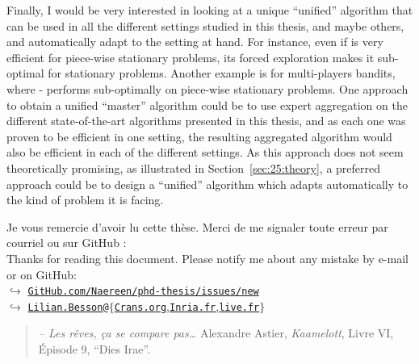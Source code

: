 Finally, I would be very interested in looking at a unique ``unified'' algorithm that can be used in all the different settings studied in this thesis, and maybe others, and automatically adapt to the setting at hand.
For instance, even if \GLRklUCB{} is very efficient for piece-wise stationary problems, its forced exploration makes it sub-optimal for stationary problems.
Another example is for multi-players bandits, where \MCTopM-\klUCB{} performs sub-optimally on piece-wise stationary problems.
One approach to obtain a unified ``master'' algorithm could be to use expert aggregation on the different state-of-the-art algorithms presented in this thesis, and as each one was proven to be efficient in one setting, the resulting aggregated algorithm would also be efficient in each of the different settings.
As this approach does not seem theoretically promising, as illustrated in Section~\ref{sec:25:theory},
a preferred approach could be to design a ``unified'' algorithm which adapts automatically to the kind of problem it is facing.





\vfill{}

\hr{}

\begin{small}
\begin{center}
    Je vous remercie d'avoir lu cette thèse. Merci de me signaler toute erreur par courriel ou sur GitHub :
    \\
    Thanks for reading this document. Please notify me about any mistake by e-mail or on GitHub:\\
    $\hookrightarrow$ \href{https://github.com/Naereen/phd-thesis/issues/new}{\texttt{GitHub.com/Naereen/phd-thesis/issues/new}}\\
    $\hookrightarrow$ \href{mailto:Lilian.Besson_at_Crans.org}{\texttt{Lilian.Besson}\texttt{@}$\{$\texttt{Crans.org},\texttt{Inria.fr},\texttt{live.fr}$\}$}
\end{center}
\end{small}

\hr{}



\begin{small}
\begin{quote}
    \emph{-- Les rêves, ça se compare pas\ldots}
    Alexandre Astier, \emph{Kaamelott}, Livre VI, Épisode 9, ``Dies Irae''.
\end{quote}
\end{small}
